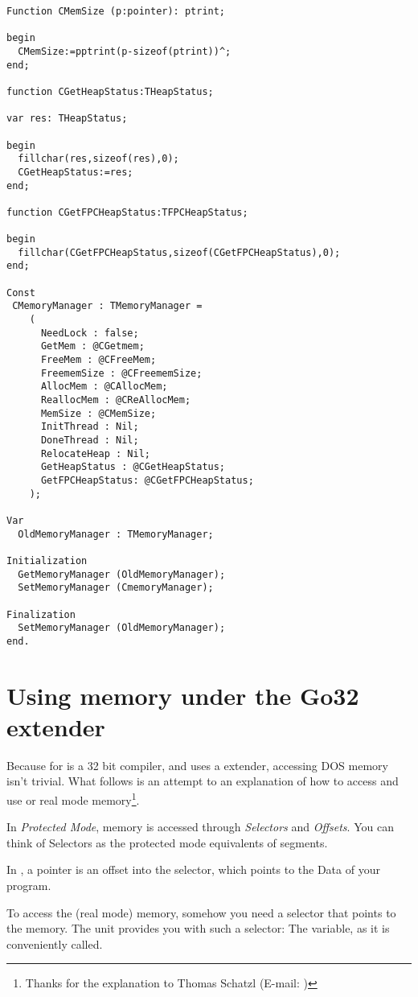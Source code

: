 \begin{verbatim}
Function CMemSize (p:pointer): ptrint;

begin
  CMemSize:=pptrint(p-sizeof(ptrint))^;
end;

function CGetHeapStatus:THeapStatus;

var res: THeapStatus;

begin
  fillchar(res,sizeof(res),0);
  CGetHeapStatus:=res;
end;

function CGetFPCHeapStatus:TFPCHeapStatus;

begin
  fillchar(CGetFPCHeapStatus,sizeof(CGetFPCHeapStatus),0);
end;

Const
 CMemoryManager : TMemoryManager =
    (
      NeedLock : false;
      GetMem : @CGetmem;
      FreeMem : @CFreeMem;
      FreememSize : @CFreememSize;
      AllocMem : @CAllocMem;
      ReallocMem : @CReAllocMem;
      MemSize : @CMemSize;
      InitThread : Nil;
      DoneThread : Nil;
      RelocateHeap : Nil;
      GetHeapStatus : @CGetHeapStatus;
      GetFPCHeapStatus: @CGetFPCHeapStatus;	
    );

Var
  OldMemoryManager : TMemoryManager;

Initialization
  GetMemoryManager (OldMemoryManager);
  SetMemoryManager (CmemoryManager);

Finalization
  SetMemoryManager (OldMemoryManager);
end.
\end{verbatim}

\section{Using \dos memory under the Go32 extender}
\label{se:AccessingDosMemory}

Because \fpc for \dos is a 32 bit compiler, and uses a \dos extender, accessing DOS
memory isn't trivial. What follows is an attempt to an explanation of how to
access and use \dos or real mode memory\footnote{Thanks for the explanation to
Thomas Schatzl (E-mail: )}.

In {\em Protected Mode}, memory is accessed through {\em Selectors} and
{\em Offsets}. You can think of Selectors as the protected mode
equivalents of segments.

In \fpc, a pointer is an offset into the  selector, which points to
the Data of your program.

To access the (real mode) \dos memory, somehow you need a selector that
points to the \dos memory.
The  unit provides you with such a selector: The
 variable, as it is conveniently called.

